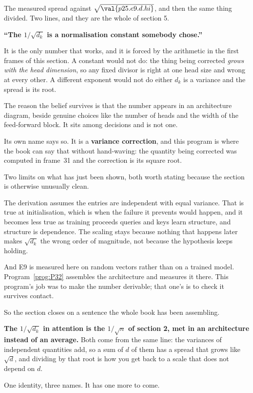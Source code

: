\begin{fr}

The measured spread against $\sqrt{\val{p25.e9.d.hi}}$, and then the same
thing divided. Two lines, and they are the whole of section 5.
\end{fr}

\begin{fr}
\begin{trapbox}
\textbf{\enquote{The $1/\sqrt{d_k}$ is a normalisation constant somebody
chose.}}

It is the only number that works, and it is forced by the arithmetic in the
first frames of this section. A constant would not do: the thing being
corrected \emph{grows with the head dimension}, so any fixed divisor is right
at one head size and wrong at every other. A different exponent would not do
either \dash{} $d_k$ is a variance and the spread is its root.

The reason the belief survives is that the number appears in an architecture
diagram, beside genuine choices like the number of heads and the width of the
feed-forward block. It sits among decisions and is not one.

Its own name says so. It is a \textbf{variance correction}, and this program
is where the book can say that without hand-waving: the quantity being
corrected was computed in frame~31 and the correction is its square root.
\end{trapbox}
\end{fr}

\begin{fr}
Two limits on what has just been shown, both worth stating because the section
is otherwise unusually clean.

The derivation assumes the entries are independent with equal variance. That
is true at initialisation, which is when the failure it prevents would happen,
and it becomes less true as training proceeds \dash{} queries and keys learn
structure, and structure is dependence. The scaling stays because nothing that
happens later makes $\sqrt{d_k}$ the wrong order of magnitude, not because the
hypothesis keeps holding.

And E9 is measured here on random vectors rather than on a trained model.
Program~\ref{prog:P32} assembles the architecture and measures it there. This
program's job was to make the number derivable; that one's is to check it
survives contact.
\end{fr}

\begin{fr}
So the section closes on a sentence the whole book has been assembling.

\textbf{The $1/\sqrt{d_k}$ in attention is the $1/\sqrt{n}$ of section 2, met
in an architecture instead of an average.} Both come from the same line: the
variances of independent quantities add, so a sum of $d$ of them has a spread
that grows like $\sqrt{d}$, and dividing by that root is how you get back to a
scale that does not depend on $d$.

One identity, three names. It has one more to come.
\end{fr}

